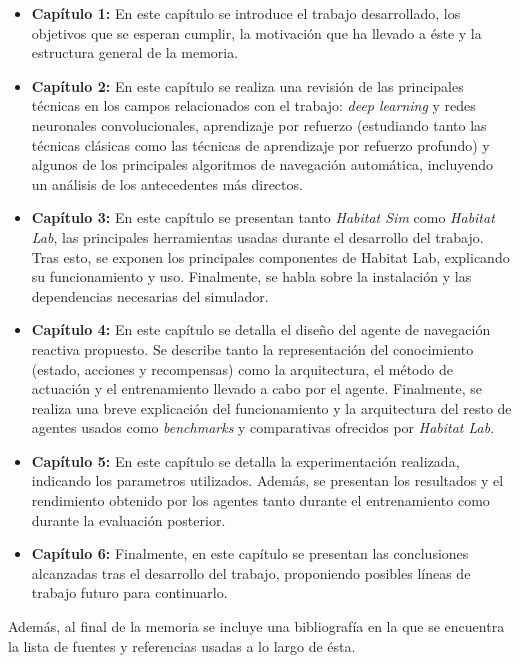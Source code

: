 \begin{itemize}
	\item \textbf{Capítulo 1:} En este capítulo se introduce el trabajo desarrollado, los objetivos que se esperan cumplir, la motivación que ha llevado a éste y la estructura general de la memoria.
	\item \textbf{Capítulo 2:} En este capítulo se realiza una revisión de las principales técnicas en los campos relacionados con el trabajo: \textit{deep learning} y redes neuronales convolucionales, aprendizaje por refuerzo (estudiando tanto las técnicas clásicas como las técnicas de aprendizaje por refuerzo profundo) y algunos de los principales algoritmos de navegación automática, incluyendo un análisis de los antecedentes más directos.
	\item \textbf{Capítulo 3:} En este capítulo se presentan tanto \textit{Habitat Sim} como \textit{Habitat Lab}, las principales herramientas usadas durante el desarrollo del trabajo. Tras esto, se exponen los principales componentes de Habitat Lab, explicando su funcionamiento y uso. Finalmente, se habla sobre la instalación y las dependencias necesarias del simulador.
	\item \textbf{Capítulo 4:} En este capítulo se detalla el diseño del agente de navegación reactiva propuesto. Se describe tanto la representación del conocimiento (estado, acciones y recompensas) como la arquitectura, el método de actuación y el entrenamiento llevado a cabo por el agente. Finalmente, se realiza una breve explicación del funcionamiento y la arquitectura del resto de agentes usados como \textit{benchmarks} y comparativas ofrecidos por \textit{Habitat Lab}.
	\item \textbf{Capítulo 5:} En este capítulo se detalla la experimentación realizada, indicando los parametros utilizados. Además, se presentan los resultados y el rendimiento obtenido por los agentes tanto durante el entrenamiento como durante la evaluación posterior.
	\item \textbf{Capítulo 6:} Finalmente, en este capítulo se presentan las conclusiones alcanzadas tras el desarrollo del trabajo, proponiendo posibles líneas de trabajo futuro para continuarlo.
\end{itemize}

Además, al final de la memoria se incluye una bibliografía en la que se encuentra la lista de fuentes y referencias usadas a lo largo de ésta.


